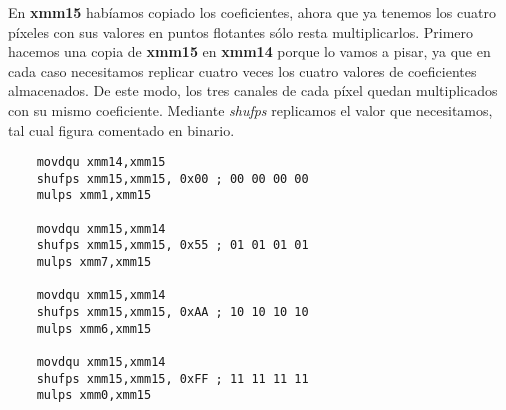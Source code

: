 \documentclass[a4paper]{article}
\begin{document}
\indent En \textbf{xmm15} hab\'iamos copiado los coeficientes, ahora que ya tenemos los cuatro p\'ixeles con sus valores en puntos flotantes s\'olo resta multiplicarlos. Primero hacemos una copia de \textbf{xmm15} en \textbf{xmm14} porque lo vamos a pisar, ya que en cada caso necesitamos replicar cuatro veces los cuatro valores de coeficientes almacenados. De este modo, los tres canales de cada p\'ixel quedan multiplicados con su mismo coeficiente. Mediante \textit{shufps} replicamos el valor que necesitamos, tal cual figura comentado en binario.
 \begin{codesnippet}
\begin{verbatim}
    movdqu xmm14,xmm15
    shufps xmm15,xmm15, 0x00 ; 00 00 00 00
    mulps xmm1,xmm15

    movdqu xmm15,xmm14
    shufps xmm15,xmm15, 0x55 ; 01 01 01 01 
    mulps xmm7,xmm15       
    
    movdqu xmm15,xmm14
    shufps xmm15,xmm15, 0xAA ; 10 10 10 10
    mulps xmm6,xmm15
    
    movdqu xmm15,xmm14
    shufps xmm15,xmm15, 0xFF ; 11 11 11 11
    mulps xmm0,xmm15
\end{verbatim}
\end{codesnippet}
\end{document}
